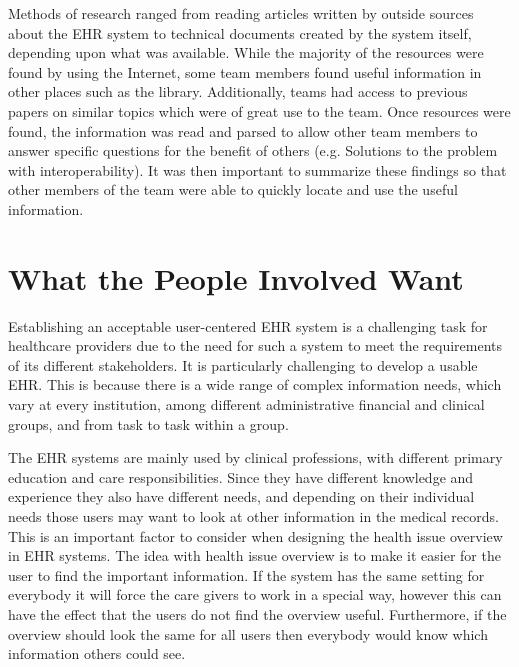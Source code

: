 \documentclass[14pt]{article}
\begin{document}
Methods of research ranged from reading articles written by outside sources about the \gls{EHR} system to technical documents created by the system itself, depending upon what was available.  While the majority of the resources were found by using the Internet, some team members found useful information in other places such as the library.  Additionally, teams had access to previous papers on similar topics which were of great use to the team.  Once resources were found, the information was read and parsed to allow other team members to answer specific questions for the benefit of others (e.g. Solutions to the problem with interoperability).  It was then important to summarize these findings so that other members of the team were able to quickly locate and use the useful information.


\newpage

\section{What the People Involved Want}
\label{sec:People}
Establishing an acceptable user-centered  \gls{EHR} system is a challenging task for healthcare providers due to the need for such a system to meet the requirements of its different stakeholders. It is particularly challenging to develop a usable  \gls{EHR}. This is because there is a wide range of complex information needs, which vary at every institution, among different administrative financial and clinical groups, and from task to task within a group.

The \gls{EHR} systems are mainly used by clinical professions, with different primary education and care responsibilities. Since they have different knowledge and experience they also have different needs, and depending on their individual needs those users may want to look at other information in the medical records. This is an important factor to consider when designing the health issue overview in \gls{EHR} systems. The idea with health issue overview is to make it easier for the user to find the important information. If the system has the same setting for everybody it will force the care givers to work in a special way, however this can have the effect that the users do not find the overview useful.  Furthermore, if the overview should look the same for all users then everybody would know which information others could see.
\end{document}

